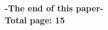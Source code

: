 \renewcommand{\thepage}{}
\printbibliography

\begin{center}
    \textbf{-The end of this paper- \\ Total page: 15}
\end{center}